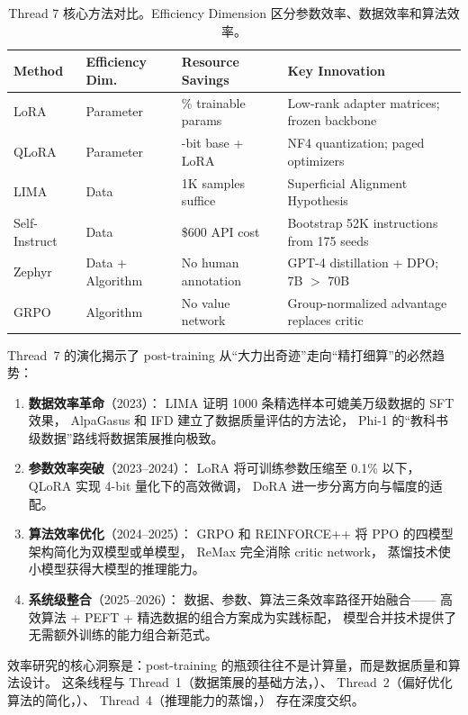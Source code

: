 \begin{table}[!ht]
\centering
\caption{Thread 7 核心方法对比。Efficiency Dimension 区分参数效率、数据效率和算法效率。}
\label{tab:efficiency-comparison}
\small
\begin{tabularx}{\textwidth}{l >{\raggedright\arraybackslash}p{2.2cm} >{\raggedright\arraybackslash}p{2.2cm} >{\raggedright\arraybackslash}X}
\toprule
\textbf{Method} & \textbf{Efficiency Dim.} & \textbf{Resource Savings} & \textbf{Key Innovation} \\
\midrule
LoRA & Parameter & 0.1\% trainable params & Low-rank adapter matrices; frozen backbone \\
QLoRA & Parameter & 4-bit base + LoRA & NF4 quantization; paged optimizers \\
LIMA & Data & 1K samples suffice & Superficial Alignment Hypothesis \\
Self-Instruct & Data & \$600 API cost & Bootstrap 52K instructions from 175 seeds \\
Zephyr & Data + Algorithm & No human annotation & GPT-4 distillation + DPO; 7B $>$ 70B \\
GRPO & Algorithm & No value network & Group-normalized advantage replaces critic \\
\bottomrule
\end{tabularx}
\end{table}

Thread~7 的演化揭示了 post-training 从``大力出奇迹''走向``精打细算''的必然趋势：

\begin{enumerate}[leftmargin=2em]
  \item \textbf{数据效率革命}（2023）：
    LIMA 证明 1000 条精选样本可媲美万级数据的 SFT 效果，
    AlpaGasus 和 IFD 建立了数据质量评估的方法论，
    Phi-1 的``教科书级数据''路线将数据策展推向极致。

  \item \textbf{参数效率突破}（2023--2024）：
    LoRA 将可训练参数压缩至 0.1\% 以下，
    QLoRA 实现 4-bit 量化下的高效微调，
    DoRA 进一步分离方向与幅度的适配。

  \item \textbf{算法效率优化}（2024--2025）：
    GRPO 和 REINFORCE++ 将 PPO 的四模型架构简化为双模型或单模型，
    ReMax 完全消除 critic network，
    蒸馏技术使小模型获得大模型的推理能力。

  \item \textbf{系统级整合}（2025--2026）：
    数据、参数、算法三条效率路径开始融合——
    高效算法 + PEFT + 精选数据的组合方案成为实践标配，
    模型合并技术提供了无需额外训练的能力组合新范式。
\end{enumerate}

效率研究的核心洞察是：post-training 的瓶颈往往不是计算量，而是数据质量和算法设计。
这条线程与 Thread~1（数据策展的基础方法，）、
Thread~2（偏好优化算法的简化，）、
Thread~4（推理能力的蒸馏，）
存在深度交织。
